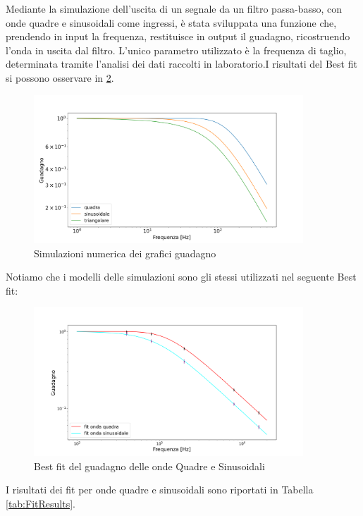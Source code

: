 \documentclass[10pt,a4paper]{article}
\begin{document}
Mediante la simulazione dell'uscita di un segnale da un filtro passa-basso, con onde quadre e sinusoidali come ingressi, è stata sviluppata una funzione che, prendendo in input la frequenza, restituisce in output il guadagno, ricostruendo l'onda in uscita dal filtro. L'unico parametro utilizzato è la frequenza di taglio, determinata tramite l'analisi dei dati raccolti in laboratorio.I risultati del Best fit si possono osservare in \ref{fig:FitG}.
\begin{figure}[H]
    \centering
    \includegraphics[width=0.9\textwidth]{img/FitG2.png}
    \caption{Simulazioni numerica dei grafici guadagno}
    \label{fig:FitG}
\end{figure}

Notiamo che i modelli delle simulazioni sono gli stessi utilizzati nel seguente Best fit:


\begin{figure}[H]
    \centering
    \includegraphics[width=0.9\textwidth]{img/FitG.png}
    \caption{Best fit del guadagno delle onde Quadre e Sinusoidali}
    \label{fig:FitG}
\end{figure}
\newpage
I risultati dei fit per onde quadre e sinusoidali sono riportati in Tabella \ref{tab:FitResults}.
\end{document}
